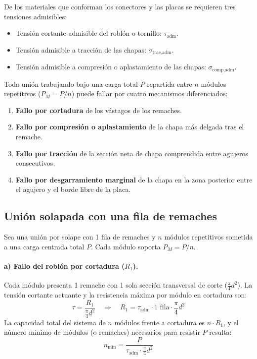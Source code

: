 De los materiales que conforman los conectores y las placas se requieren tres tensiones admisibles:
\begin{itemize}
    \item Tensión cortante admisible del roblón o tornillo: $\tau_{\text{adm}}$.
    \item Tensión admisible a tracción de las chapas: $\sigma_{\text{trac,adm}}$.
    \item Tensión admisible a compresión o aplastamiento de las chapas: $\sigma_{\text{comp,adm}}$.
\end{itemize}

Toda unión trabajando bajo una carga total $P$ repartida entre $n$ módulos repetitivos ($P_M = P/n$) puede fallar por cuatro mecanismos diferenciados:
\begin{enumerate}[label=\alph*)]
    \item \textbf{Fallo por cortadura} de los vástagos de los remaches.
    \item \textbf{Fallo por compresión o aplastamiento} de la chapa más delgada tras el remache.
    \item \textbf{Fallo por tracción} de la sección neta de chapa comprendida entre agujeros consecutivos.
    \item \textbf{Fallo por desgarramiento marginal} de la chapa en la zona posterior entre el agujero y el borde libre de la placa.
\end{enumerate}

\subsection{Unión solapada con una fila de remaches}

Sea una unión por solape con 1 fila de remaches y $n$ módulos repetitivos sometida a una carga centrada total $P$. Cada módulo soporta $P_M = P/n$.

\paragraph{a) Fallo del roblón por cortadura ($R_1$).}
Cada módulo presenta 1 remache con 1 sola sección transversal de corte ($\frac{\pi}{4}d^2$). La tensión cortante actuante y la resistencia máxima por módulo en cortadura son:
\begin{equation}
    \tau = \frac{R_1}{\frac{\pi}{4}d^2} \quad \Longrightarrow \quad R_1 = \tau_{\text{adm}} \cdot 1\text{ fila} \cdot \frac{\pi}{4}d^2
    \label{eq:t8_R1_solape1}
\end{equation}
La capacidad total del sistema de $n$ módulos frente a cortadura es $n \cdot R_1$, y el número mínimo de módulos (o remaches) necesarios para resistir $P$ resulta:
\begin{equation}
    n_{\text{mín}} = \frac{P}{\tau_{\text{adm}} \cdot \frac{\pi}{4}d^2}
\end{equation}

